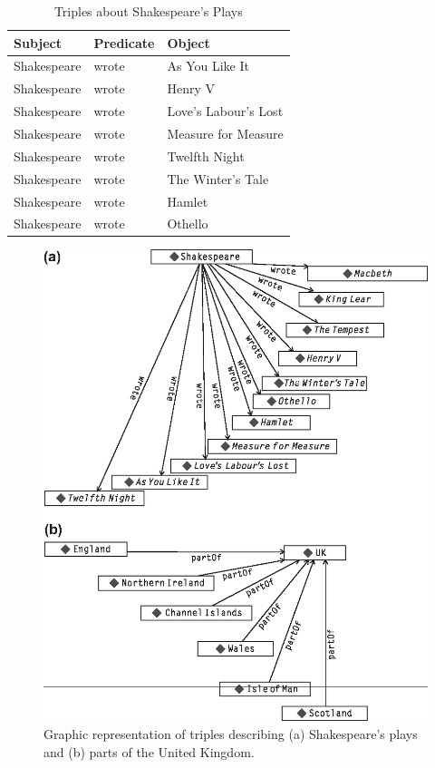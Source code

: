\begin{table}[h]
\centering
\begin{tabular}{||l l l||} 
 \hline
 Subject&Predicate&Object \\ [0.5ex] 
 \hline\hline
Shakespeare&wrote&As You Like It\\
Shakespeare&wrote&Henry V\\
Shakespeare&wrote&Love's Labour's Lost \\
Shakespeare&wrote&Measure for Measure \\
Shakespeare&wrote&Twelfth Night \\
Shakespeare&wrote&The Winter's Tale \\
Shakespeare&wrote&Hamlet\\
Shakespeare&wrote&Othello\\
\hline
\end{tabular}
\caption{Triples about Shakespeare's Plays}
\label{tab:ch3.4}
\end{table}


\begin{figure}
    \centering
    \includegraphics[width=5.0in]{media/f03-05ab-9780123859655.eps}
    \caption{Graphic representation of triples describing (a) Shakespeare’s plays and (b) parts of the United Kingdom.}
    \label{fig:ch3.5}
\end{figure}


